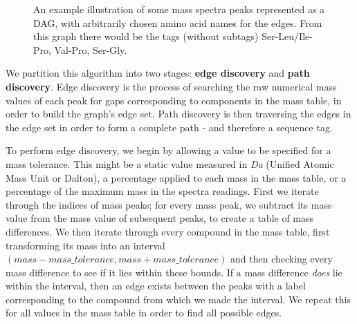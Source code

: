 \documentclass{l4proj}
\begin{document}
\begin{figure}
    \centering

    \caption{An example illustration of some mass spectra peaks represented as a DAG, with arbitrarily chosen amino acid names for the edges. From this 	    graph there would be the tags (without subtags) Ser-Leu/Ile-Pro, Val-Pro, Ser-Gly.
    }

    \label{fig:peak_graph}
\end{figure}

We partition this algorithm into two stages: \textbf{edge discovery} and \textbf{path discovery}. Edge discovery is the process of searching the raw numerical mass values of each peak for gaps corresponding to components in the mass table, in order to build the graph's edge set. Path discovery is then traversing the edges in the edge set in order to form a complete path - and therefore a sequence tag.

To perform edge discovery, we begin by allowing a value to be specified for a mass tolerance. This might be a static value measured in \textit{Da} (Unified Atomic Mass Unit or Dalton), a percentage applied to each mass in the mass table, or a percentage of the maximum mass in the spectra readings. First we iterate through the indices of mass peaks; for every mass peak, we subtract its mass value from the mass value of subsequent peaks, to create a table of mass differences. We then iterate through every compound in the mass table, first transforming its mass into an interval \((mass - mass\_tolerance, mass + mass\_tolerance)\) and then checking every mass difference to see if it lies within these bounds. If a mass difference \textit{does} lie within the interval, then an edge exists between the peaks with a label corresponding to the compound from which we made the interval. We repeat this for all values in the mass table in order to find all possible edges.
\end{document}
